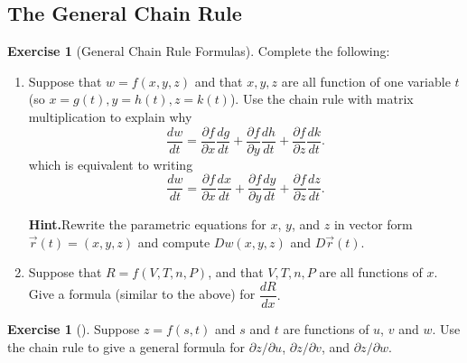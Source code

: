 \documentclass[10pt,]{book}
\theoremstyle{plain}
\theoremstyle{definition}
\theoremstyle{definition}
\theoremstyle{definition}
\theoremstyle{definition}
\newtheorem{exploration}[project]{Exercise}
\theoremstyle{definition}
\numberwithin{equation}{section}
\begin{document}
\subsection[{The General Chain Rule}]{The General Chain Rule}\label{subsection-39}
\begin{exploration}[General Chain Rule Formulas]\label{exploration-155}
Complete the following:%
\begin{enumerate}[font=\bfseries,label=(\alph*),ref=\alph*]
\item\label{task-367} Suppose that \(w=f(x,y,z)\) and that \(x,y,z\) are all function of one variable \(t\) (so \(x=g(t), y=h(t), z=k(t)\)). Use the chain rule with matrix multiplication to explain why%
\begin{equation*}
\frac{dw}{dt} 
= \frac{\partial f}{\partial x}\frac{dg}{dt}+\frac{\partial f}{\partial y}\frac{dh}{dt}+\frac{\partial f}{\partial z}\frac{dk}{dt} 
.
\end{equation*}
which is equivalent to writing%
\begin{equation*}
\frac{dw}{dt} 
= \frac{\partial f}{\partial x}\frac{dx}{dt}+\frac{\partial f}{\partial y}\frac{dy}{dt}+\frac{\partial f}{\partial z}\frac{dz}{dt} 
.
\end{equation*}
%
\par\medskip\noindent%
\textbf{Hint.}\quad Rewrite the parametric equations for \(x\), \(y\), and \(z\) in vector form \(\vec r(t) = (x,y,z)\) and compute \(Dw(x,y,z)\) and \(D\vec r(t)\).%
\item\label{task-368} Suppose that \(R=f(V,T,n,P)\), and that \(V,T,n,P\) are all functions of \(x\).  Give a formula (similar to the above) for \(\dfrac{dR}{dx}.\)%
\end{enumerate}
\end{exploration}
\begin{exploration}[]\label{exploration-156}
Suppose \(z=f(s,t)\) and \(s\) and \(t\) are functions of \(u\), \(v\) and \(w\). Use the chain rule to give a general formula for \(\partial z/\partial u\), \(\partial z/\partial v\), and \(\partial z/\partial w\).%
\end{exploration}
\end{document}
